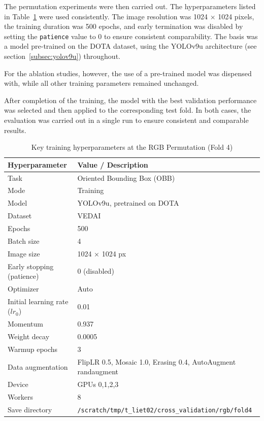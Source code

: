 The permutation experiments were then carried out. The hyperparameters listed in Table~\ref{tab:hyperparameters} were used consistently. The image resolution was 1024 × 1024 pixels, the training duration was 500 epochs, and early termination was disabled by setting the \texttt{patience} value to 0 to ensure consistent comparability. The basis was a model pre-trained on the \acrshort{DOTA} dataset, using the \acrshort{YOLO}v9u architecture (see section~\ref{subsec:yolov9u}) throughout.
  
For the ablation studies, however, the use of a pre-trained model was dispensed with, while all other training parameters remained unchanged.  

After completion of the training, the model with the best validation performance was selected and then applied to the corresponding test fold. In both cases, the evaluation was carried out in a single run to ensure consistent and comparable results.
    



\begin{table}[htbp]
\centering

\begin{tabular}{ll}
\hline
\textbf{Hyperparameter} & \textbf{Value / Description} \\
\hline
Task & Oriented Bounding Box (OBB) \\
Mode & Training \\
Model & YOLOv9u, pretrained on \acrshort{DOTA} \\
Dataset & \acrshort{VEDAI}  \\
Epochs & 500 \\
Batch size & 4 \\
Image size & 1024 × 1024 px \\
Early stopping (patience) & 0 (disabled) \\
Optimizer & Auto \\
Initial learning rate ($lr_0$) & 0.01 \\
Momentum & 0.937 \\
Weight decay & 0.0005 \\
Warmup epochs & 3 \\
Data augmentation & FlipLR 0.5, Mosaic 1.0, Erasing 0.4, AutoAugment randaugment \\
Device & GPUs 0,1,2,3 \\
Workers & 8 \\
Save directory & \texttt{/scratch/tmp/t\_liet02/cross\_validation/rgb/fold4} \\
\hline
\end{tabular}
\caption{Key training hyperparameters at the \acrshort{RGB} Permutation (Fold 4)}
\label{tab:hyperparameters}
\end{table}



